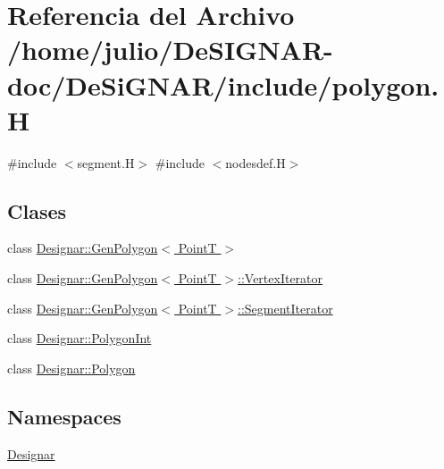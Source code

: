 \hypertarget{polygon_8_h}{}\section{Referencia del Archivo /home/julio/\+De\+S\+I\+G\+N\+A\+R-\/doc/\+De\+Si\+G\+N\+A\+R/include/polygon.H}
\label{polygon_8_h}
{\ttfamily \#include $<$segment.\+H$>$}\newline
{\ttfamily \#include $<$nodesdef.\+H$>$}\newline
\subsection*{Clases}
\begin{DoxyCompactItemize}
\item 
class \hyperlink{class_designar_1_1_gen_polygon}{Designar\+::\+Gen\+Polygon$<$ Point\+T $>$}
\item 
class \hyperlink{class_designar_1_1_gen_polygon_1_1_vertex_iterator}{Designar\+::\+Gen\+Polygon$<$ Point\+T $>$\+::\+Vertex\+Iterator}
\item 
class \hyperlink{class_designar_1_1_gen_polygon_1_1_segment_iterator}{Designar\+::\+Gen\+Polygon$<$ Point\+T $>$\+::\+Segment\+Iterator}
\item 
class \hyperlink{class_designar_1_1_polygon_int}{Designar\+::\+Polygon\+Int}
\item 
class \hyperlink{class_designar_1_1_polygon}{Designar\+::\+Polygon}
\end{DoxyCompactItemize}
\subsection*{Namespaces}
\begin{DoxyCompactItemize}
\item 
 \hyperlink{namespace_designar}{Designar}
\end{DoxyCompactItemize}
